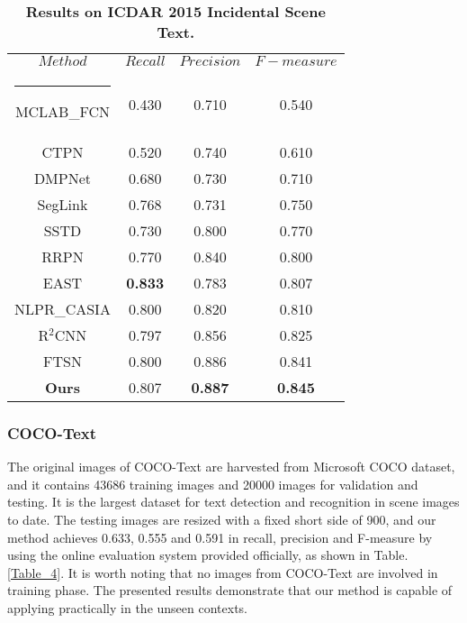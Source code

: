 \documentclass[3p, times]{elsarticle}
\makeatletter
\newcommand{\thickhline}{\noalign {\ifnum 0=`}\fi \hrule height 1pt
    \futurelet \reserved@a \@xhline
}
\newcommand{\topcaption}{\setlength{\abovecaptionskip}{0pt}\setlength{\belowcaptionskip}{8pt}\caption}
\makeatother
\begin{document}
\setlength{\tabcolsep}{14pt}
\begin{table}[!htb]
\centering
\topcaption{\textbf{Results on ICDAR 2015 Incidental Scene Text.}}
\label{Table_3}
\begin{tabular}{|c|c|c|c|} 
    \hline
    $Method$                            & $Recall$    & $Precision$ & $F-measure$ \\\thickhline
    MCLAB\_FCN \cite{MTD2016CVPR}       & 0.430       & 0.710       & 0.540       \\\hline
    CTPN \cite{CTPN2016ECCV}            & 0.520       & 0.740       & 0.610       \\\hline
    DMPNet \cite{DMPN2017CVPR}          & 0.680       & 0.730       & 0.710       \\\hline
    SegLink \cite{SEGLINK2017CVPR}      & 0.768       & 0.731       & 0.750       \\\hline
    SSTD \cite{SSTD2017ICCV}            & 0.730       & 0.800       & 0.770       \\\hline
    RRPN \cite{RRPN2017ARXIV}           & 0.770       & 0.840       & 0.800       \\\hline
    EAST \cite{EAST2017CVPR}            & {\bf 0.833} & 0.783       & 0.807       \\\hline
    NLPR\_CASIA \cite{DDR2017ICCV}      & 0.800       & 0.820       & 0.810       \\\hline
    R{$^{2}$}CNN \cite{RRCNN2017ARXIV}  & 0.797       & 0.856       & 0.825       \\\hline
    FTSN \cite{FTSN2017ARXIV}           & 0.800       & 0.886       & 0.841       \\\hline
    \textbf{Ours}                       & 0.807       & {\bf 0.887} & {\bf 0.845} \\\hline
\end{tabular}
\end{table}
\setlength{\tabcolsep}{1.4pt}



\subsubsection{COCO-Text}

The original images of COCO-Text \cite{COCO2016ARXIV} are harvested from Microsoft COCO \cite{MSCOCO2014ECCV} dataset, and it contains 43686 training images and 20000 images for validation and testing. It is the largest dataset for text detection and recognition in scene images to date. The testing images are resized with a fixed short side of 900, and our method achieves 0.633, 0.555 and 0.591 in recall, precision and F-measure by using the online evaluation system provided officially, as shown in Table.\ref{Table_4}. It is worth noting that no images from COCO-Text are involved in training phase. The presented results demonstrate that our method is capable of applying practically in the unseen contexts. 
\end{document}
